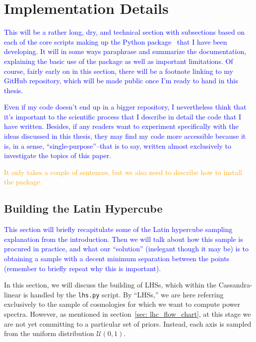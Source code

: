 \chapter{Implementation Details}
\label{chap: implementation}

\textcolor{blue}{This will be a rather long, dry, and technical section with 
subsections based on each of the core scripts making up the Python package \
that I have been developing. It will in some ways paraphrase and summarize the 
documentation, explaining the basic use of the package as well as important 
limitations. Of course, fairly early on in this section, there will be a 
footnote linking to my GitHub repository, which will be made public once I'm 
ready to hand in this thesis.}

\textcolor{blue}{Even if my code doesn't end up in a bigger repository, I 
nevertheless think that it's important to the scientific process that I 
describe in detail the code that I have written. Besides, if any readers want 
to experiment specifically with the ideas discussed in this thesis, they may 
find my code more accessible because it is, in a sense, ``single-purpose''--that 
is to say, written almost exclusively to investigate the topics of this 
paper.}

\textcolor{orange}{It only takes a couple of sentences, but we also need to 
describe how to install the package.}

\section{Building the Latin Hypercube}
\label{sec: build_lhc}


\textcolor{blue}{This section will briefly recapitulate some of the Latin hypercube sampling
explanation from the introduction. Then we will talk about how this sample is
procured in practice, and what our ``solution'' (inelegant though it may be)
is to obtaining a sample with a decent minimum separation between the points
(remember to briefly repeat why this is important).}

In this section, we will discuss the building of LHSs, which within the
Cassandra-linear is handled by the \verb|lhs.py| script.
By ``LHSs,'' we are here referring exclusively to the
sample of cosmologies for which we want to compute power spectra.
However, as mentioned in section~\ref{sec: lhc_flow_chart}, at this stage we 
are not yet committing to a particular set of priors. Instead, each axis is 
sampled from the uniform distribution $\mathcal{U} (0, 1)$.

